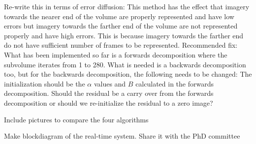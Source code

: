 \begin{todolist}
\begin{todolist}
    \item Re-write this in terms of error diffusion: This method has the effect that imagery towards the nearer end of the volume are properly represented and have low errors but imagery towards the farther end of the volume are not represented properly and have high errors. This is because imagery towards the farther end do not have sufficient number of frames to be represented. Recommended fix: What has been implemented so far is a forwards decomposition where the subvolume iterates from 1 to 280. What is needed is a backwards decomposition too, but for the backwards decomposition, the following needs to be changed: The initialization should be the $\alpha$ values and $B$ calculated in the forwards decomposition. Should the residual be a carry over from the forwards decomposition or should we re-initialize the residual to a zero image?
    \end{todolist}
\item Include pictures to compare the four algorithms
\item Make blockdiagram of the real-time system. Share it with the PhD committee
\end{todolist}

